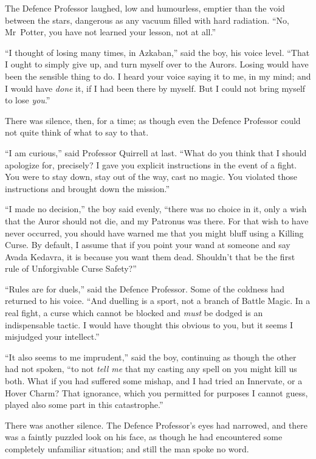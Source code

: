 The Defence Professor laughed, low and humourless, emptier than the void between the stars, dangerous as any vacuum filled with hard radiation.
“No, Mr~Potter, you have not learned your lesson, not at all.”

“I thought of losing many times, in Azkaban,” said the boy, his voice level.
“That I ought to simply give up, and turn myself over to the Aurors. Losing would have been the sensible thing to do. I heard your voice saying it to me, in my mind; and I would have \emph{done} it, if I had been there by myself. But I could not bring myself to lose \emph{you}.”

There was silence, then, for a time; as though even the Defence Professor could not quite think of what to say to that.

“I am curious,” said Professor Quirrell at last.
“What do you think that I should apologize for, precisely? I gave you explicit instructions in the event of a fight. You were to stay down, stay out of the way, cast no magic. You violated those instructions and brought down the mission.”

“I made no decision,” the boy said evenly, “there was no choice in it, only a wish that the Auror should not die, and my Patronus was there. For that wish to have never occurred, you should have warned me that you might bluff using a Killing Curse. By default, I assume that if you point your wand at someone and say Avada Kedavra, it is because you want them dead. Shouldn’t that be the first rule of Unforgivable Curse Safety?”

“Rules are for duels,” said the Defence Professor. Some of the coldness had returned to his voice.
“And duelling is a sport, not a branch of Battle Magic. In a real fight, a curse which cannot be blocked and \emph{must} be dodged is an indispensable tactic. I would have thought this obvious to you, but it seems I misjudged your intellect.”

“It also seems to me imprudent,” said the boy, continuing as though the other had not spoken, “to not \emph{tell me} that my casting any spell on you might kill us both. What if you had suffered some mishap, and I had tried an Innervate, or a Hover Charm? That ignorance, which you permitted for purposes I cannot guess, played also some part in this catastrophe.”

There was another silence. The Defence Professor’s eyes had narrowed, and there was a faintly puzzled look on his face, as though he had encountered some completely unfamiliar situation; and still the man spoke no word.

